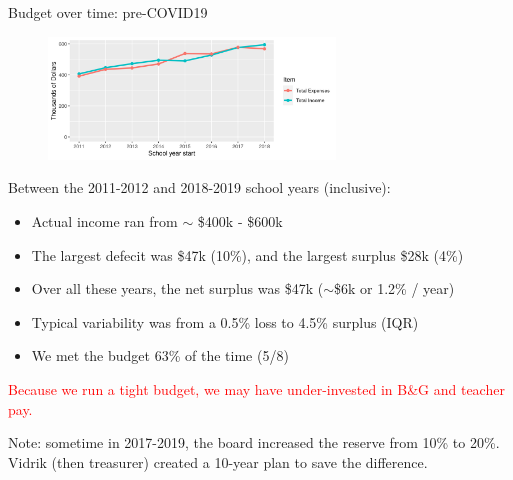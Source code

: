 \documentclass[8pt]{beamer}
\begin{document}

\begin{frame}{Budget over time: pre-COVID19}
\begin{figure}
\begin{center}
\includegraphics[width=3in]{budget_history.png}
\end{center}
\end{figure}

Between the 2011-2012 and 2018-2019 school years (inclusive):
%
\begin{itemize}
%
\item Actual income ran from $\sim$ \$400k - \$600k
\item The largest defecit was \$47k (10\%), and the largest surplus \$28k (4\%)
\item Over all these years, the net surplus was \$47k ($\sim$\$6k or 1.2\% / year)
\item Typical variability was from a 0.5\% loss to 4.5\% surplus (IQR)
\item We met the budget 63\% of the time (5/8)
%
\end{itemize}
%
\textcolor{red}{Because we run a tight budget, we may have
under-invested in B\&G and teacher pay.}

Note: sometime in 2017-2019, the board increased the reserve
from 10\% to 20\%.
Vidrik (then treasurer) created a 10-year plan to save the difference.


\end{frame}


\end{document}
